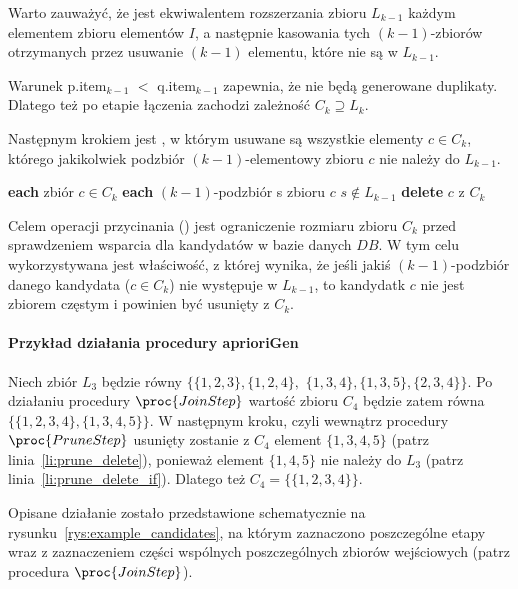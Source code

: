 Warto zauważyć, że  jest ekwiwalentem rozszerzania zbioru $L_{k-1}$ każdym elementem zbioru elementów $I$, a następnie kasowania tych $(k-1)$-zbiorów otrzymanych przez usuwanie $(k-1)$ elementu, które nie są w $L_{k-1}$. 

Warunek p.item$_{k-1}$ $<$ q.item$_{k-1}$ zapewnia, że nie będą generowane duplikaty. Dlatego też po etapie łączenia zachodzi zależność $C_k \supseteq L_k$.

Następnym krokiem jest , w którym usuwane są wszystkie elementy $c \in C_k$, którego jakikolwiek podzbiór $(k-1)$-elementowy zbioru $c$ nie należy do $L_{k-1}$.

\begin{codebox}
		\li \For \textbf{each} zbiór $c \in C_k$ 
		\li \Do
			\li \For \textbf{each} $(k-1)$-podzbiór s zbioru $c$
					\li \Do 
						\If $s \notin L_{k-1}$ \label{li:prune_delete_if}
						\li \Then
							\textbf{delete} $c$ z $C_k$\label{li:prune_delete}
						\End
					\End
		\End
\end{codebox}

Celem operacji przycinania () jest ograniczenie rozmiaru zbioru $C_k$ przed sprawdzeniem wsparcia dla kandydatów w bazie danych $DB$. W tym celu wykorzystywana jest właściwość, z której wynika, że jeśli jakiś $(k-1)$-podzbiór danego kandydata ($c \in C_k$) nie występuje w $L_{k-1}$, to kandydatk $c$ nie jest zbiorem częstym i powinien być usunięty z $C_k$.

\paragraph{Przykład działania procedury aprioriGen}
Niech zbiór $L_3$ będzie równy $\lbrace \lbrace 1, 2, 3 \rbrace, \lbrace 1,2,4 \rbrace,$ $\lbrace 1,3,4 \rbrace, \lbrace 1, 3, 5 \rbrace, \lbrace 2, 3, 4 \rbrace \rbrace$. Po działaniu procedury $\proc{Join Step}$ wartość zbioru $C_4$ będzie zatem równa $\lbrace \lbrace 1, 2, 3, 4 \rbrace, \lbrace 1, 3, 4, 5 \rbrace \rbrace$. W następnym kroku, czyli wewnątrz procedury $\proc{Prune Step}$ usunięty zostanie z $C_4$ element $\lbrace 1, 3, 4, 5 \rbrace$ (patrz linia~\ref{li:prune_delete}), ponieważ element $\lbrace 1, 4, 5 \rbrace$ nie należy do $L_3$ (patrz linia~\ref{li:prune_delete_if}). Dlatego też $C_4 = \lbrace \lbrace 1, 2, 3, 4 \rbrace \rbrace$. 

Opisane działanie zostało przedstawione schematycznie na rysunku~\ref{rys:example_candidates}, na którym zaznaczono poszczególne etapy wraz z zaznaczeniem części wspólnych poszczególnych zbiorów wejściowych (patrz procedura $\proc{Join Step}$).

